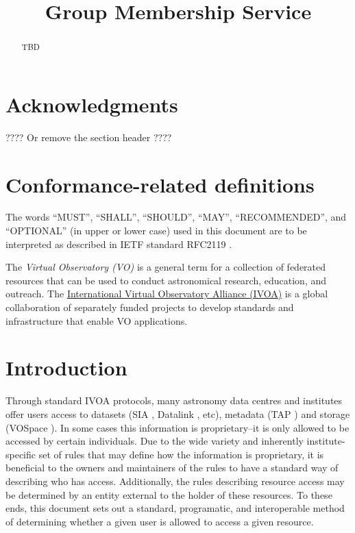 \documentclass[11pt,a4paper]{ivoa}
\title{Group Membership Service}
\author{}
\author{}
\begin{document}
\begin{abstract}

TBD

\end{abstract}


\section*{Acknowledgments}

???? Or remove the section header ????

\section*{Conformance-related definitions}

The words ``MUST'', ``SHALL'', ``SHOULD'', ``MAY'', ``RECOMMENDED'', and
``OPTIONAL'' (in upper or lower case) used in this document are to be
interpreted as described in IETF standard RFC2119 \citep{std:RFC2119}.

The \emph{Virtual Observatory (VO)} is a
general term for a collection of federated resources that can be used
to conduct astronomical research, education, and outreach.
The \href{http://www.ivoa.net}{International
Virtual Observatory Alliance (IVOA)} is a global
collaboration of separately funded projects to develop standards and
infrastructure that enable VO applications.


\section{Introduction}

Through standard IVOA protocols, many astronomy data centres and institutes offer users access to datasets (SIA \citep{std:SIAP}, Datalink \citep{std:Datalink}, etc), metadata (TAP \citep{std:TAP}) and storage (VOSpace \citep{std:VOSpace}).  In some cases this information is proprietary--it is only allowed to be accessed by certain individuals.  Due to the wide variety and inherently institute-specific set of rules that may define how the information is proprietary, it is beneficial to the owners and maintainers of the rules to have a standard way of describing who has access.  Additionally, the rules describing resource access may be determined by an entity external to the holder of these resources.  To these ends, this document sets out a standard, programatic, and interoperable method of determining whether a given user is allowed to access a given resource.
\end{document}
